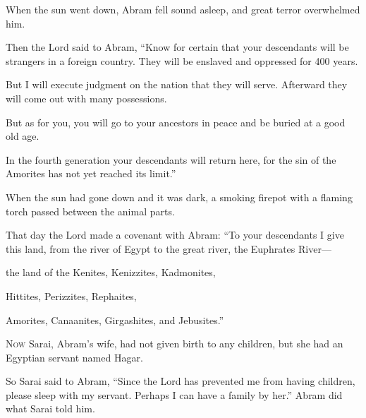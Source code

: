 \begin{scripture}
 When the sun went down, Abram fell sound asleep, and great terror overwhelmed him.
 Then the Lord said to Abram, ``Know for certain that your descendants will be strangers in a foreign country. They will be enslaved and oppressed for 400 years.
 But I will execute judgment on the nation that they will serve. Afterward they will come out with many possessions.
 But as for you, you will go to your ancestors in peace and be buried at a good old age.
 In the fourth generation your descendants will return here, for the sin of the Amorites has not yet reached its limit.''
\everypar{}

 When the sun had gone down and it was dark, a smoking firepot with a flaming torch passed between the animal parts.
 That day the Lord made a covenant with Abram: ``To your descendants I give this land, from the river of Egypt to the great river, the Euphrates River---
 the land of the Kenites, Kenizzites, Kadmonites,
 Hittites, Perizzites, Rephaites,
 Amorites, Canaanites, Girgashites, and Jebusites.''

 \allowchapbreak\hypertarget{ch-genesis-16}{}\lettrine[lines=5]{\color{pentateuch}N}{\textsc{ow}} Sarai, Abram's wife, had not given birth to any children, but she had an Egyptian servant named Hagar.\everypar{}
 So Sarai said to Abram, ``Since the Lord has prevented me from having children, please sleep with my servant. Perhaps I can have a family by her.'' Abram did what Sarai told him.
\everypar{}


\end{scripture}
